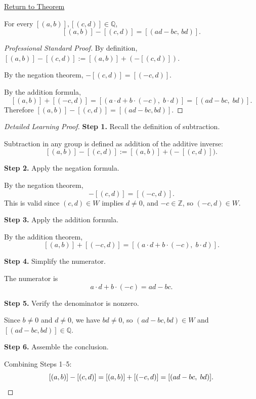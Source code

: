 \newpage
{}
\label{prf:ec-subtraction}

\begin{remark*}[Return]
\hyperref[thm:ec-subtraction]{Return to Theorem}
\end{remark*}

\begin{theorem*}
For every $[(a,b)],[(c,d)]\in\mathbb{Q}$,
\[
[(a,b)] - [(c,d)] = [(ad-bc,\,bd)].
\]
\end{theorem*}

\begin{proof}[Professional Standard Proof]
\LRAProofBodyStart
By definition, $[(a,b)] - [(c,d)] := [(a,b)] + (-[(c,d)])$.

By the negation theorem, $-[(c,d)] = [(-c,d)]$.

By the addition formula,
\[
[(a,b)] + [(-c,d)]
= [(a\cdot d + b\cdot(-c),\; b\cdot d)]
= [(ad - bc,\; bd)].
\]
Therefore $[(a,b)] - [(c,d)] = [(ad-bc,bd)]$.
\end{proof}

\begin{proof}[Detailed Learning Proof]
\LRAProofBodyStart

\textbf{Step 1.} Recall the definition of subtraction.

Subtraction in any group is defined as addition of the additive inverse:
\[
[(a,b)] - [(c,d)] := [(a,b)] + \bigl(-[(c,d)]\bigr).
\]

\textbf{Step 2.} Apply the negation formula.

By the negation theorem,
\[
-[(c,d)] = [(-c,d)].
\]
This is valid since $(c,d)\in W$ implies $d\neq 0$, and $-c\in\mathbb{Z}$,
so $(-c,d)\in W$.

\textbf{Step 3.} Apply the addition formula.

By the addition theorem,
\[
[(a,b)] + [(-c,d)]
= [(a\cdot d + b\cdot(-c),\; b\cdot d)].
\]

\textbf{Step 4.} Simplify the numerator.

The numerator is
\[
a\cdot d + b\cdot(-c) = ad - bc.
\]

\textbf{Step 5.} Verify the denominator is nonzero.

Since $b\neq 0$ and $d\neq 0$, we have $bd\neq 0$, so $(ad-bc,bd)\in W$
and $[(ad-bc,bd)]\in\mathbb{Q}$.

\textbf{Step 6.} Assemble the conclusion.

Combining Steps 1--5:
\[
[(a,b)] - [(c,d)]
= [(a,b)] + [(-c,d)]
= [(ad-bc,\; bd)]. \qedhere
\]
\end{proof}


